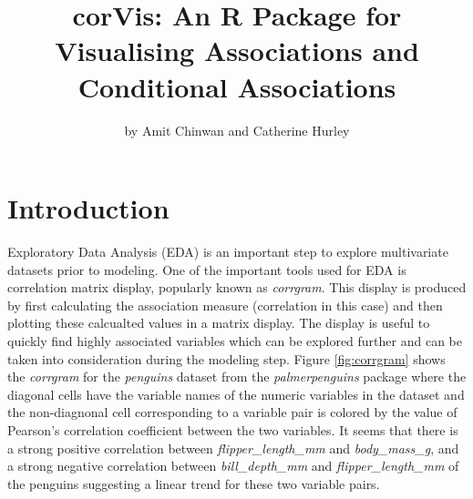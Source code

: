 \title{corVis: An R Package for Visualising Associations and Conditional
Associations}
\author{by Amit Chinwan and Catherine Hurley}

\maketitle


\hypertarget{introduction}{%
\section{Introduction}\label{introduction}}

Exploratory Data Analysis (EDA) is an important step to explore
multivariate datasets prior to modeling. One of the important tools used
for EDA is correlation matrix display, popularly known as
\emph{corrgram}\citep{friendly2002corrgrams}. This display is produced
by first calculating the association measure (correlation in this case)
and then plotting these calcualted values in a matrix display. The
display is useful to quickly find highly associated variables which can
be explored further and can be taken into consideration during the
modeling step. Figure \ref{fig:corrgram} shows the \emph{corrgram} for
the \emph{penguins} dataset from the \emph{palmerpenguins} package where
the diagonal cells have the variable names of the numeric variables in
the dataset and the non-diagnonal cell corresponding to a variable pair
is colored by the value of Pearson's correlation coefficient between the
two variables. It seems that there is a strong positive correlation
between \emph{flipper\_length\_mm} and \emph{body\_mass\_g}, and a
strong negative correlation between \emph{bill\_depth\_mm} and
\emph{flipper\_length\_mm} of the penguins suggesting a linear trend for
these two variable pairs.

